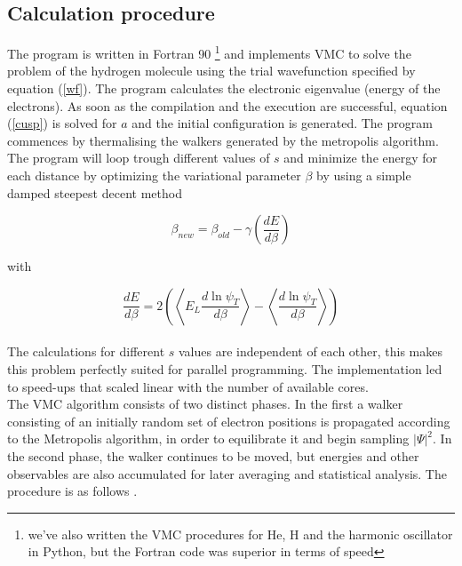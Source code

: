 \documentclass{article}
\begin{document}
\subsection{Calculation procedure}
The program is written in Fortran 90 \footnote{we've also written the VMC procedures for He, H and the harmonic oscillator in Python, but the Fortran code was superior in terms of speed} and implements VMC to solve the  problem of the hydrogen molecule using the trial wavefunction specified by equation (\ref{wf}). The program calculates the electronic eigenvalue (energy of the electrons). As soon as the compilation and the execution are successful, equation (\ref{cusp}) is solved for $a$ and the initial configuration is generated. The program commences by thermalising the walkers generated by the metropolis algorithm. The program will loop trough different values of $s$ and minimize the energy for each distance by optimizing the variational parameter $\beta$ by using a simple damped steepest decent method \citep{thijssen2007computational, harju2001wigner}

\begin{equation}
 \beta_{new}=\beta_{old}-\gamma \left( \frac{dE}{d\beta} \right)
\end{equation}

with 

\begin{equation}
\frac{dE}{d\beta}= 2\left(  \left\langle E_L \frac{d \ln \psi_T }{d \beta} \right\rangle - \left\langle \frac{d \ln \psi_T}{d \beta} \right\rangle \right)
\end{equation} \\
The calculations for different $s$ values are independent of each other, this makes this problem perfectly suited for parallel programming. The implementation led to speed-ups that scaled linear with the number of available cores.\\

The VMC algorithm consists of two distinct phases. In the first a walker consisting of an initially random set of electron positions is propagated according to the Metropolis algorithm, in order to equilibrate it and begin sampling $\vert\Psi\vert^2$. In the second phase, the walker continues to be moved, but energies and other observables are also accumulated for later averaging and statistical analysis. The procedure is as follows \citep{thijssen2007computational}.
\end{document}
